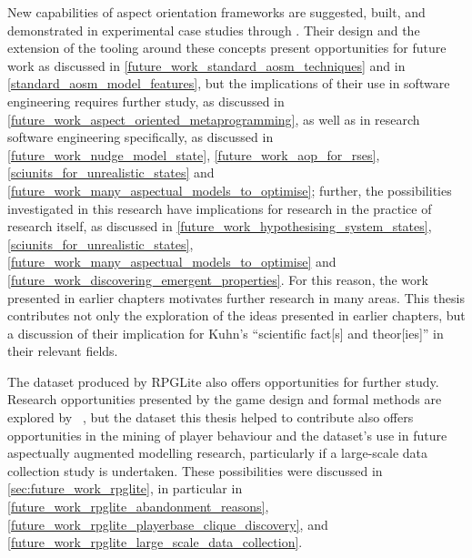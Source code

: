 New capabilities of aspect orientation frameworks are suggested, built, and
demonstrated in experimental case studies through \pdsf{}. Their design and the
extension of the tooling around these concepts present opportunities for future
work as discussed in \cref{future_work_standard_aosm_techniques} and in
\cref{standard_aosm_model_features}, but the implications of their use in
software engineering requires further study, as discussed in
\cref{future_work_aspect_oriented_metaprogramming}, as well as in research
software engineering specifically, as discussed in
\cref{future_work_nudge_model_state}, \cref{future_work_aop_for_rses},
\cref{sciunits_for_unrealistic_states} and
\cref{future_work_many_aspectual_models_to_optimise}; further, the possibilities
investigated in this research have implications for research in the practice of
research itself, as discussed in \cref{future_work_hypothesising_system_states},
\cref{sciunits_for_unrealistic_states},
\cref{future_work_many_aspectual_models_to_optimise} and
\cref{future_work_discovering_emergent_properties}. For this reason, the work
presented in earlier chapters motivates further research in many areas. This
thesis contributes not only the exploration of the ideas presented in earlier
chapters, but a discussion of their implication for Kuhn's ``scientific fact[s]
and theor[ies]'' in their relevant fields.


The dataset produced by RPGLite also offers opportunities for further study.
Research opportunities presented by the game design and formal methods are
explored by \citeauthor{kavanagh2021thesis}~\cite{kavanagh2021thesis}, but the
dataset this thesis helped to contribute also offers opportunities in the
mining of player behaviour and the dataset's use in future aspectually
augmented modelling research, particularly if a large-scale data collection
study is undertaken. These possibilities were discussed in
\cref{sec:future_work_rpglite}, in particular in
\cref{future_work_rpglite_abandonment_reasons},
\cref{future_work_rpglite_playerbase_clique_discovery}, and \cref{future_work_rpglite_large_scale_data_collection}.


